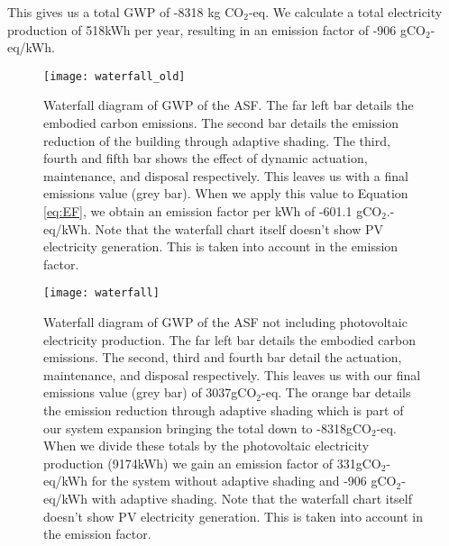 This gives us a total GWP of -8318 kg CO$_{2}$-eq. We calculate a total electricity production of 518kWh per year, resulting in an emission factor of -906 gCO$_{2}$-eq/kWh.

\begin{figure}[H]
\begin{center}
\begin{mdframed}[linecolor=magenta, linewidth=2pt]
\texttt{[image: waterfall\_old]}
\caption{Waterfall diagram of GWP of the ASF. The far left bar details the embodied carbon emissions. The second bar details the emission reduction of the building through adaptive shading. The third, fourth and fifth bar shows the effect of dynamic actuation, maintenance, and disposal respectively. This leaves us with a final emissions value (grey bar). When we apply this value to Equation \ref{eq:EF}, we obtain an emission factor per kWh of -601.1 gCO$_2$.-eq/kWh. Note that the waterfall chart itself doesn't show PV electricity generation. This is taken into account in the emission factor.}

\label{fig:waterfallold}
\end{mdframed}
\end{center}
\end{figure}


\begin{figure}[H]
\begin{center}
\begin{mdframed}[linecolor=cyan, linewidth=2pt]
\texttt{[image: waterfall]}
\caption{Waterfall diagram of GWP of the ASF not including photovoltaic electricity production. The far left bar details the embodied carbon emissions. The second, third and fourth bar detail the actuation, maintenance, and disposal respectively. This leaves us with our final emissions value (grey bar) of 3037gCO$_2$-eq. The orange bar details the emission reduction through adaptive shading which is part of our system expansion bringing the total down to -8318gCO$_2$-eq. When we divide these totals by the photovoltaic electricity production (9174kWh) we gain an emission factor of 331gCO$_2$-eq/kWh for the system without adaptive shading and -906 gCO$_2$-eq/kWh with adaptive shading. Note that the waterfall chart itself doesn't show PV electricity generation. This is taken into account in the emission factor.}

\label{fig:waterfall}
\end{mdframed}
\end{center}
\end{figure}

